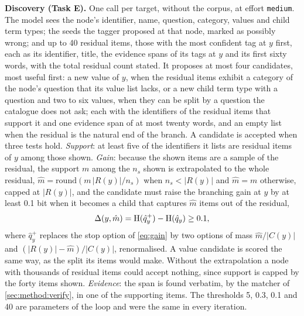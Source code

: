 \textbf{Discovery (Task E).} One call per target, without the corpus, at
effort \texttt{medium}. The model sees the node's identifier, name, question,
category, values and child term types; the seeds the tagger proposed at that
node, marked as possibly wrong; and up to 40 residual items, those with the
most confident tag at $y$ first, each as its identifier, title, the evidence
spans of its tags at $y$ and its first sixty words, with the total residual
count stated. It proposes at most four candidates, most useful first: a new
value of $y$, when the residual items exhibit a category of the node's
question that its value list lacks, or a new child term type with a question
and two to six values, when they can be split by a question the catalogue
does not ask; each with the identifiers of the residual items that support it
and one evidence span of at most twenty words, and an empty list when the
residual is the natural end of the branch. A candidate is accepted when three
tests hold. \emph{Support}: at least five of the identifiers it lists are
residual items of $y$ among those shown. \emph{Gain}: because the shown items
are a sample of the residual, the support $m$ among the $n_s$ shown is
extrapolated to the whole residual, $\hat m = \mathrm{round}(m\,|R(y)|/n_s)$
when $n_s < |R(y)|$ and $\hat m = m$ otherwise, capped at $|R(y)|$, and the
candidate must raise the branching gain at $y$ by at least 0.1 bit when it
becomes a child that captures $\hat m$ items out of the residual,
\begin{equation}
  \label{eq:cgain}
  \Delta(y, \hat m) = \operatorname{H}(\hat q_y^{+}) - \operatorname{H}(\hat q_y) \ge 0.1,
\end{equation}
where $\hat q_y^{+}$ replaces the stop option of \cref{eq:gain} by two options
of mass $\hat m/|C(y)|$ and $(|R(y)| - \hat m)/|C(y)|$, renormalised. A value
candidate is scored the same way, as the split its items would make. Without
the extrapolation a node with thousands of residual items could accept
nothing, since support is capped by the forty items shown. \emph{Evidence}:
the span is found verbatim, by the matcher of \cref{sec:method:verify}, in one
of the supporting items. The thresholds 5, 0.3, 0.1 and 40 are parameters of
the loop and were the same in every iteration.

